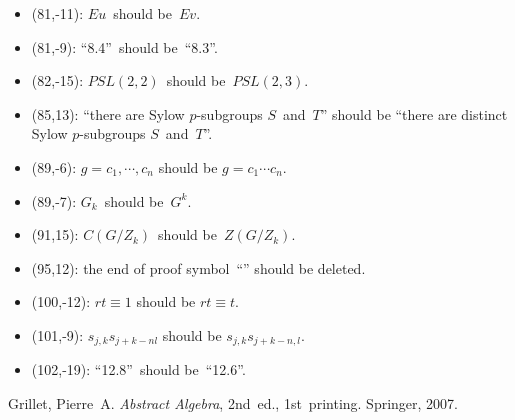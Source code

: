 \documentclass[letterpaper,12pt]{article}
\begin{document}
\begin{itemize}
\item (81,-11): \(Eu\)~should be~\(Ev\).
\item (81,-9): ``8.4''~should be~``8.3''.
\item (82,-15): \(PSL(2,2)\)~should be~\(PSL(2,3)\).
\item (85,13): ``there are Sylow \(p\)-subgroups \(S\)~and~\(T\)'' should be ``there are distinct Sylow \(p\)-subgroups \(S\)~and~\(T\)''.
\item (89,-6): \(g=c_1,\cdots,c_n\) should be \(g=c_1\cdots c_n\).
\item (89,-7): \(G_k\)~should be~\(G^k\).
\item (91,15): \(C(G/Z_k)\)~should be~\(Z(G/Z_k)\).
\item (95,12): the end of proof symbol~``\qedsymbol'' should be deleted.
\item (100,-12): \(rt\equiv 1\) should be \(rt\equiv t\).
\item (101,-9): \(s_{j,k}s_{j+k-nl}\) should be \(s_{j,k}s_{j+k-n,l}\).
\item (102,-19): ``12.8''~should be~``12.6''.
\end{itemize}

\begin{thebibliography}{0}
 Grillet, Pierre~A. \textit{Abstract Algebra}, 2nd~ed., 1st~printing. Springer, 2007.
\end{thebibliography}
\end{document}
